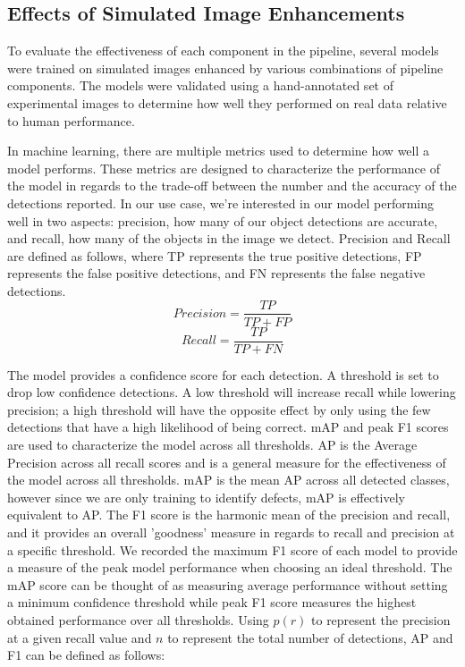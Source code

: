 \documentclass[prl,reprint,showpacs,floatfix,nofootinbib]{revtex4-1}
\begin{document}
\subsection{Effects of Simulated Image Enhancements}

To evaluate the effectiveness of each component in the pipeline, several models were trained on simulated images enhanced by various combinations of pipeline components. The models were validated using a hand-annotated set of experimental images to determine how well they performed on real data relative to human performance.

In machine learning, there are multiple metrics used to determine how well a model performs. These metrics are designed to characterize the performance of the model in regards to the trade-off between the number and the accuracy of the detections reported. In our use case, we're interested in our model performing well in two aspects: precision, how many of our object detections are accurate, and recall, how many of the objects in the image we detect. Precision and Recall are defined as follows, where TP represents the true positive detections, FP represents the false positive detections, and FN represents the false negative detections.
$$ Precision = \frac{TP}{TP+FP} $$
$$ Recall = \frac{TP}{TP+FN} $$

The model provides a confidence score for each detection. A threshold is set to drop low confidence detections. A low threshold will increase recall while lowering precision; a high threshold will have the opposite effect by only using the few detections that have a high likelihood of being correct. mAP and peak F1 scores are used to characterize the model across all thresholds. AP is the Average Precision across all recall scores and is a general measure for the effectiveness of the model across all thresholds. mAP is the mean AP across all detected classes, however since we are only training to identify defects, mAP is effectively equivalent to AP. The F1 score is the harmonic mean of the precision and recall, and it provides an overall 'goodness' measure in regards to recall and precision at a specific threshold. We recorded the maximum F1 score of each model to provide a measure of the peak model performance when choosing an ideal threshold. The mAP\cite{everingham_pascal_2010} score can be thought of as measuring average performance without setting a minimum confidence threshold while peak F1\cite{chinchor_muc-4_1992} score measures the highest obtained performance over all thresholds. Using $p(r)$ to represent the precision at a given recall value and $n$ to represent the total number of detections, AP and F1 can be defined as follows:
\end{document}
